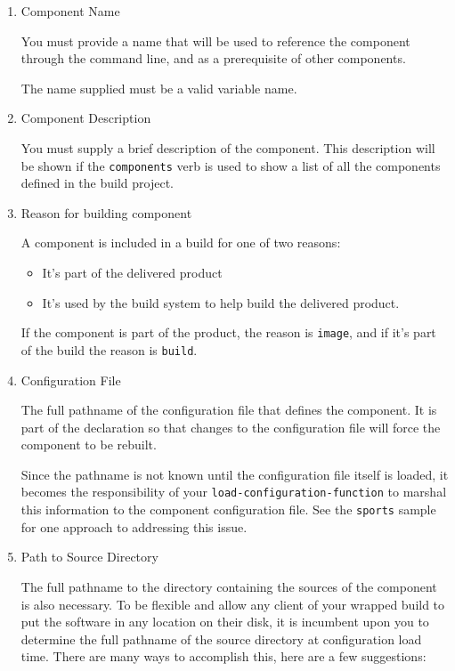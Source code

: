\begin{enumerate}
\item Component Name

  You must provide a name that will be used to reference the component
  through the \lmsbw command line, and as a prerequisite of other
  components.

  The name supplied must be a valid \makefile variable name.

\item Component Description

  You must supply a brief description of the component.  This
  description will be shown if the \texttt{components} verb is used to
  show a list of all the components defined in the build project.

\item Reason for building component

  A component is included in a build for one of two reasons:

  \begin{itemize}
    \item It's part of the delivered product
    \item It's used by the build system to help build the delivered
      product.
  \end{itemize}

  If the component is part of the product, the reason is
  \texttt{image}, and if it's part of the build the reason is
  \texttt{build}.

\item Configuration File

  The full pathname of the configuration file that defines the
  component.  It is part of the declaration so that changes to the
  configuration file will force the component to be rebuilt.

  Since the pathname is not known until the configuration file itself
  is loaded, it becomes the responsibility of your
  \texttt{load-configuration-function} to marshal this information to
  the component configuration file.  See the \texttt{sports} sample
  for one approach to addressing this issue.

\item Path to Source Directory

  The full pathname to the directory containing the sources of the
  component is also necessary.  To be flexible and allow any client of
  your wrapped build to put the software in any location on their
  disk, it is incumbent upon you to determine the full pathname of the
  source directory at configuration load time.  There are many ways to
  accomplish this, here are a few suggestions:


\end{enumerate}
